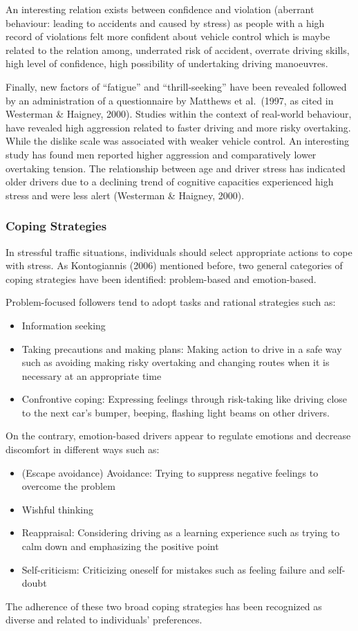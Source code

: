 \documentclass[
11pt, %
oneside, %
english, %
singlespacing, %
]{macthesis} %
\begin{document}
An interesting relation exists between confidence and violation (aberrant behaviour: leading to accidents and caused by stress) as people with a high record of violations felt more confident about vehicle control which is maybe related to the relation among, underrated risk of accident, overrate driving skills, high level of confidence, high possibility of undertaking driving manoeuvres.

Finally, new factors of ``fatigue'' and ``thrill-seeking'' have been revealed followed by an administration of a questionnaire by Matthews et al.~(1997, as cited in Westerman \& Haigney, 2000). Studies within the context of real-world behaviour, have revealed high aggression related to faster driving and more risky overtaking. While the dislike scale was associated with weaker vehicle control. An interesting study has found men reported higher aggression and comparatively lower overtaking tension. The relationship between age and driver stress has indicated older drivers due to a declining trend of cognitive capacities experienced high stress and were less alert (Westerman \& Haigney, 2000).

\hypertarget{coping-strategies}{%
\subsubsection{Coping Strategies}\label{coping-strategies}}

In stressful traffic situations, individuals should select appropriate actions to cope with stress. As Kontogiannis (2006) mentioned before, two general categories of coping strategies have been identified: problem-based and emotion-based.

Problem-focused followers tend to adopt tasks and rational strategies such as:
\begin{itemize}
\item
  Information seeking
\item
  Taking precautions and making plans: Making action to drive in a safe way such as avoiding making risky overtaking and changing routes when it is necessary at an appropriate time
\item
  Confrontive coping: Expressing feelings through risk-taking like driving close to the next car's bumper, beeping, flashing light beams on other drivers.
\end{itemize}
On the contrary, emotion-based drivers appear to regulate emotions and decrease discomfort in different ways such as:
\begin{itemize}
\item
  (Escape avoidance) Avoidance: Trying to suppress negative feelings to overcome the problem
\item
  Wishful thinking
\item
  Reappraisal: Considering driving as a learning experience such as trying to calm down and emphasizing the positive point
\item
  Self-criticism: Criticizing oneself for mistakes such as feeling failure and self-doubt
\end{itemize}
The adherence of these two broad coping strategies has been recognized as diverse and related to individuals' preferences.
\end{document}
